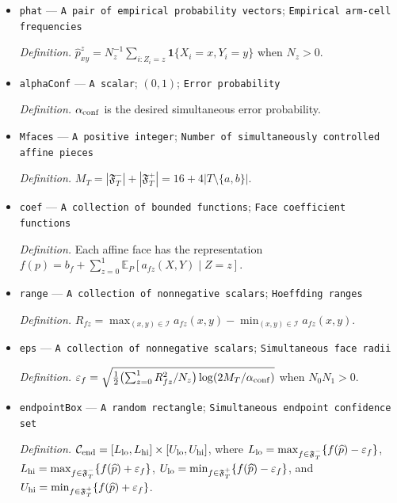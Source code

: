 \documentclass{article}
\begin{document}
\begin{itemize}
  \par\smallskip\noindent\emph{Definition.} \(N_z=\sum_{i=1}^n\mathbf 1\{Z_i=z\}\).
  \item \texttt{phat} --- \texttt{A pair of empirical probability vectors}; \texttt{Empirical arm-\allowbreak{}cell frequencies}
  \par\smallskip\noindent\emph{Definition.} \(\widehat p^z_{xy}=N_z^{-1}\sum_{i:Z_i=z}\mathbf 1\{X_i=x,Y_i=y\}\) when \(N_z>0\).
  \item \texttt{alphaConf} --- \texttt{A scalar}; \((0,1)\); \texttt{Error probability}
  \par\smallskip\noindent\emph{Definition.} \(\alpha_{\rm conf}\) is the desired simultaneous error probability.
  \item \texttt{Mfaces} --- \texttt{A positive integer}; \texttt{Number of simultaneously controlled affine pieces}
  \par\smallskip\noindent\emph{Definition.} \(M_T=|\mathfrak F^-_T|+|\mathfrak F^+_T|=16+4|T\setminus\{a,b\}|\).
  \item \texttt{coef} --- \texttt{A collection of bounded functions}; \texttt{Face coefficient functions}
  \par\smallskip\noindent\emph{Definition.} Each affine face has the representation \(f(p)=b_f+\sum_{z=0}^1\mathbb E_P[a_{fz}(X,Y)\mid Z=z]\).
  \item \texttt{range} --- \texttt{A collection of nonnegative scalars}; \texttt{Hoeffding ranges}
  \par\smallskip\noindent\emph{Definition.} \(R_{fz}=\max_{(x,y)\in\mathcal I}a_{fz}(x,y)-\min_{(x,y)\in\mathcal I}a_{fz}(x,y)\).
  \item \texttt{eps} --- \texttt{A collection of nonnegative scalars}; \texttt{Simultaneous face radii}
  \par\smallskip\noindent\emph{Definition.} \(\varepsilon_f=\sqrt{\tfrac12\bigl(\sum_{z=0}^1R_{fz}^2/N_z\bigr)\log(2M_T/\alpha_{\rm conf})}\) when \(N_0N_1>0\).
  \item \texttt{endpointBox} --- \texttt{A random rectangle}; \texttt{Simultaneous endpoint confidence set}
  \par\smallskip\noindent\emph{Definition.} \(\mathcal C_{\rm end}=[L_{\rm lo},L_{\rm hi}]\times[U_{\rm lo},U_{\rm hi}]\), where \(L_{\rm lo}=\max_{f\in\mathfrak F^-_T}\{f(\widehat p)-\varepsilon_f\}\), \(L_{\rm hi}=\max_{f\in\mathfrak F^-_T}\{f(\widehat p)+\varepsilon_f\}\), \(U_{\rm lo}=\min_{f\in\mathfrak F^+_T}\{f(\widehat p)-\varepsilon_f\}\), and \(U_{\rm hi}=\min_{f\in\mathfrak F^+_T}\{f(\widehat p)+\varepsilon_f\}\).

\end{itemize}
\end{document}
